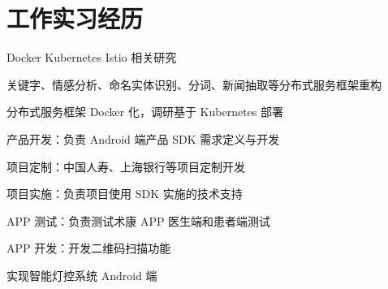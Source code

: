 \documentclass[]{deedy-resume-openfont}
\begin{document}
\hfill
\begin{minipage}[t]{0.68\textwidth}


\section{工作实习经历}

\sectionsep
{}
\vspace{\topsep}
\vspace{\topsep}
\begin{tightemize}
\item Docker Kubernetes Istio 相关研究
\item 关键字、情感分析、命名实体识别、分词、新闻抽取等分布式服务框架重构
\item 分布式服务框架 Docker 化，调研基于 Kubernetes 部署
\end{tightemize}
\sectionsep

\sectionsep
{}
\vspace{\topsep}
\vspace{\topsep}
\begin{tightemize}
\item 产品开发：负责 Android 端产品 SDK 需求定义与开发
\item 项目定制：中国人寿、上海银行等项目定制开发
\item 项目实施：负责项目使用 SDK 实施的技术支持
\end{tightemize}
\sectionsep

\sectionsep
{}
\vspace{\topsep}
\begin{tightemize}
\item APP 测试：负责测试术康 APP 医生端和患者端测试
\item APP 开发：开发二维码扫描功能
\end{tightemize}
\sectionsep

\sectionsep
{}
\vspace{\topsep}
\begin{tightemize}
\item 实现智能灯控系统 Android 端
\end{tightemize}
\sectionsep


\end{minipage}
\end{document}
